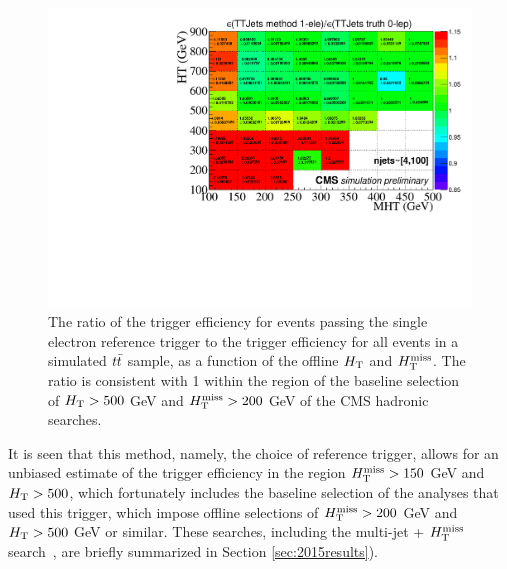 \begin{figure}[h]
  \begin{center}
    \includegraphics[width=0.95\linewidth]{figures/trigger/EfficiencyRatioMethodTruth.pdf}
    \caption{
      The ratio of the trigger efficiency for events passing the single
      electron reference trigger to the trigger efficiency for all
      events in a simulated $t\bar{t}$ sample, as a function of the offline $H_{\rm T}$
      and $H_{\text{T}}^{\rm miss}$. The ratio is consistent with 1 within the region of
      the baseline selection of $H_{\rm T}>500$ GeV and $H_{\text{T}}^{\rm miss}>200$ GeV of the CMS hadronic searches.
    }
    \label{fig:2dEffRatio}
  \end{center}
\end{figure}
It is seen that this method, namely, the choice of reference trigger, allows for an unbiased estimate of the trigger efficiency in the region $H_{\text{T}}^{\rm miss}>150$ GeV and $H_{\rm T}>500$, which fortunately includes the baseline selection of the analyses that used this trigger, which impose offline selections of $H_{\text{T}}^{\rm miss}>200$ GeV and $H_{\rm T}>500$ GeV or similar.
These searches, including the multi-jet + $H_{\text{T}}^{\rm miss}$ search~\cite{Khachatryan:2016kdk}, are briefly summarized in Section \ref{sec:2015results}). 

